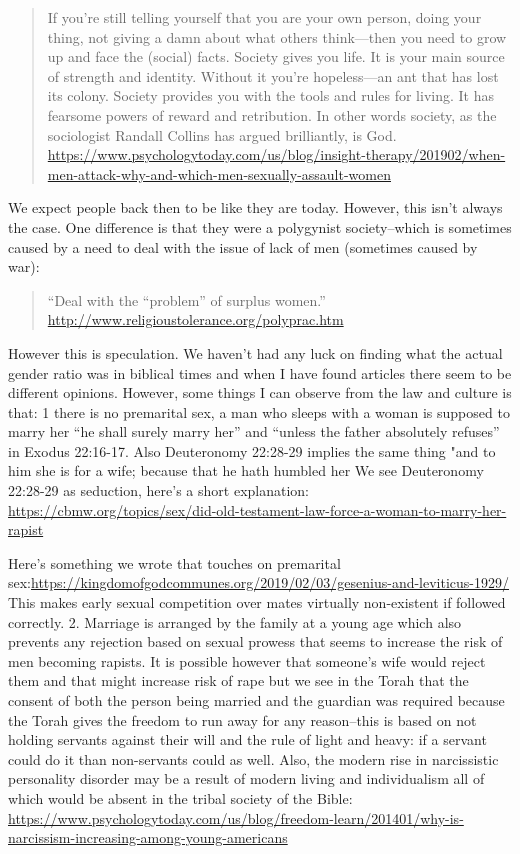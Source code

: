 \documentclass[11pt]{article}
\begin{document}
\begin{quote}
If you’re still telling yourself that you are your own person, doing your thing, not giving a damn about what others think—then you need to grow up and face the (social) facts. Society gives you life. It is your main source of strength and identity. Without it you’re hopeless—an ant that has lost its colony. Society provides you with the tools and rules for living. It has fearsome powers of reward and retribution. In other words society, as the sociologist Randall Collins has argued brilliantly, is God.
\url{https://www.psychologytoday.com/us/blog/insight-therapy/201902/when-men-attack-why-and-which-men-sexually-assault-women}
\end{quote}

We expect people back then to be like they are today. However, this isn’t always the case. One difference is that they were a polygynist society--which is sometimes caused by a need to deal with the issue of lack of men (sometimes caused by war):
\begin{quote}
“Deal with the “problem” of surplus women.” \newline
\url{http://www.religioustolerance.org/polyprac.htm}
\end{quote}
However this is speculation. We haven’t had any luck on finding what the actual gender ratio was in biblical times and when I have found articles there seem to be different opinions. However, some things I can observe from the law and culture is that: 1 there is no premarital sex, a man who sleeps with a woman is supposed to marry her “he shall surely marry her” and “unless the father absolutely refuses” in Exodus 22:16-17. Also Deuteronomy 22:28-29 implies the same thing "and to him she is for a wife; because that he hath humbled her We see Deuteronomy 22:28-29 as seduction, here's a short explanation: \url{https://cbmw.org/topics/sex/did-old-testament-law-force-a-woman-to-marry-her-rapist} 

Here’s something we wrote that touches on premarital sex:\newline \url{https://kingdomofgodcommunes.org/2019/02/03/gesenius-and-leviticus-1929/} This makes early sexual competition over mates virtually non-existent if followed correctly. 2. Marriage is arranged by the family at a young age which also prevents any rejection based on sexual prowess that seems to increase the risk of men becoming rapists. It is possible however that someone’s wife would reject them and that might increase risk of rape but we see in the Torah that the consent of both the person being married and the guardian was required because the Torah gives the freedom to run away for any reason--this is based on not holding servants against their will and the rule of light and heavy: if a servant could do it than non-servants could as well. Also, the modern rise in narcissistic personality disorder may be a result of modern living and individualism all of which would be absent in the tribal society of the Bible: \url{https://www.psychologytoday.com/us/blog/freedom-learn/201401/why-is-narcissism-increasing-among-young-americans}
\end{document}
